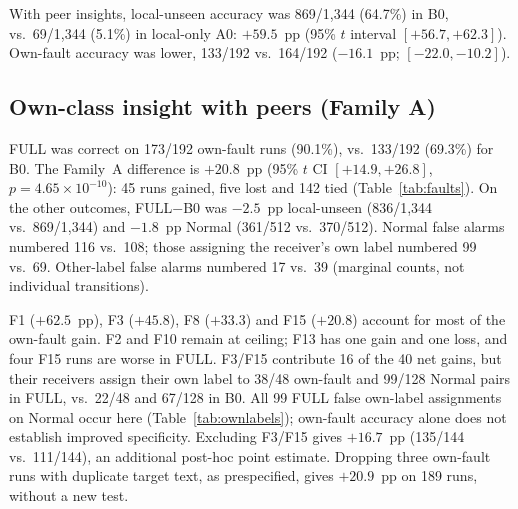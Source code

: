 \documentclass[conference]{IEEEtran}
\newcommand{\cond}[1]{\textsf{#1}}
\begin{document}
With peer insights, local-unseen accuracy was 869/1,344 (64.7\%) in \cond{B0}, vs.\ 69/1,344 (5.1\%) in local-only \cond{A0}: $+59.5$~pp (95\% $t$ interval $[+56.7, +62.3]$). Own-fault accuracy was lower, 133/192 vs.\ 164/192 ($-16.1$~pp; $[-22.0, -10.2]$).

\begin{table}[!t]
\centering\footnotesize
\caption{Prospectively specified 256-run test. Accuracy is in percent and contrasts in percentage points (pp) at the fixed denominator. Family A uses 192 own-fault physical runs; Family B uses 24 runs per fault, averaging seven local-unseen receivers within run. The gpt-oss rows are exploratory descriptive, not additional tests.}
\label{tab:t2main}
\setlength{\tabcolsep}{4pt}

\end{table}

\begin{table}[!t]
\centering\footnotesize
\caption{LLM operational accuracy by receiver role and response state, all at planned denominators (2,048 pairs per LLM condition). Abstentions, parser rejections and truncations are retained as non-correct. Numerical rules issue one receiver-independent prediction per case and have no LLM response states.}
\label{tab:t2arms}
\setlength{\tabcolsep}{5pt}

\end{table}

\subsection{Own-class insight with peers (Family A)}
\cond{FULL} was correct on 173/192 own-fault runs (90.1\%), vs.\ 133/192 (69.3\%) for \cond{B0}. The Family~A difference is $+20.8$~pp (95\% $t$ CI $[+14.9,+26.8]$, $p=4.65\times10^{-10}$): 45 runs gained, five lost and 142 tied (Table~\ref{tab:faults}). On the other outcomes, \cond{FULL}$-$\cond{B0} was $-2.5$~pp local-unseen (836/1,344 vs.\ 869/1,344) and $-1.8$~pp Normal (361/512 vs.\ 370/512). Normal false alarms numbered 116 vs.\ 108; those assigning the receiver's own label numbered 99 vs.\ 69. Other-label false alarms numbered 17 vs.\ 39 (marginal counts, not individual transitions).

F1 ($+62.5$~pp), F3 ($+45.8$), F8 ($+33.3$) and F15 ($+20.8$) account for most of the own-fault gain. F2 and F10 remain at ceiling; F13 has one gain and one loss, and four F15 runs are worse in \cond{FULL}. F3/F15 contribute 16 of the 40 net gains, but their receivers assign their own label to 38/48 own-fault and 99/128 Normal pairs in \cond{FULL}, vs.\ 22/48 and 67/128 in \cond{B0}. All 99 \cond{FULL} false own-label assignments on Normal occur here (Table~\ref{tab:ownlabels}); own-fault accuracy alone does not establish improved specificity. Excluding F3/F15 gives $+16.7$~pp (135/144 vs.\ 111/144), an additional post-hoc point estimate. Dropping three own-fault runs with duplicate target text, as prespecified, gives $+20.9$~pp on 189 runs, without a new test.
\end{document}
